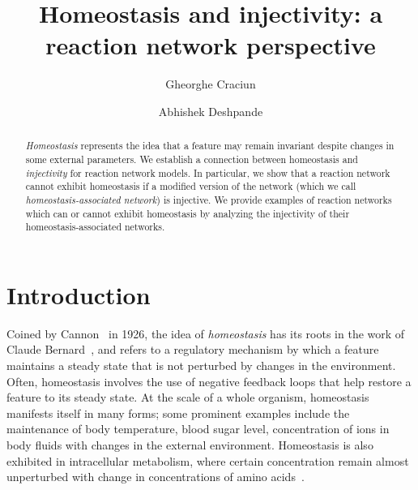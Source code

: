 \documentclass[11pt]{article}
\theoremstyle{plain}
\theoremstyle{definition}
\theoremstyle{remark}
\begin{document}
\title{Homeostasis and injectivity: a reaction network perspective}

\author[1]{Gheorghe Craciun}
\author[2]{Abhishek Deshpande}


\maketitle



\begin{abstract}
\noindent
{\em Homeostasis} represents the idea that a  feature may remain invariant despite  changes in some external parameters. 
We establish a connection between homeostasis and \emph{injectivity} for reaction network models. In particular, we show that a reaction network cannot exhibit homeostasis if a modified version of the network (which we call  \emph{homeostasis-associated  network}) is injective. We provide examples of reaction networks which can or cannot exhibit homeostasis by analyzing the injectivity of their homeostasis-associated networks.
\end{abstract}

\section{Introduction}

Coined by Cannon~\cite{cannon1926physiological} in 1926, the idea of \emph{homeostasis} has its roots in the work of Claude Bernard~\cite{bernard1898introduction}, and refers to a regulatory mechanism by which a feature maintains a steady state that is not perturbed by changes in the environment. Often, homeostasis involves the use of negative feedback loops that help restore a feature to its steady state. At the scale of a whole organism, homeostasis manifests itself in many forms; some prominent examples include the maintenance of body temperature, blood sugar level, concentration of ions in body fluids with changes in the external environment. Homeostasis is also exhibited in intracellular metabolism, where certain concentration remain almost unperturbed with change in concentrations of amino acids~\cite{reed2017analysis}.
\end{document}
